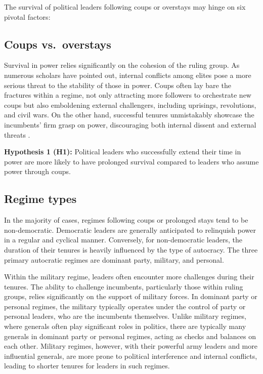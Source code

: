 \documentclass[
  a4paper,
  12pt]{article}
\begin{document}
The survival of political leaders following coups or overstays may hinge
on six pivotal factors:

\subsection{Coups vs.~overstays}\label{coups-vs.-overstays}

Survival in power relies significantly on the cohesion of the ruling
group. As numerous scholars have pointed out, internal conflicts among
elites pose a more serious threat to the stability of those in power.
Coups often lay bare the fractures within a regime, not only attracting
more followers to orchestrate new coups but also emboldening external
challengers, including uprisings, revolutions, and civil wars. On the
other hand, successful tenures unmistakably showcase the incumbents'
firm grasp on power, discouraging both internal dissent and external
threats \citep{dahl2023}.

\textbf{Hypothesis 1 (H1):} Political leaders who successfully extend
their time in power are more likely to have prolonged survival compared
to leaders who assume power through coups.

\subsection{Regime types}\label{regime-types}

In the majority of cases, regimes following coups or prolonged stays
tend to be non-democratic. Democratic leaders are generally anticipated
to relinquish power in a regular and cyclical manner. Conversely, for
non-democratic leaders, the duration of their tenures is heavily
influenced by the type of autocracy. The three primary autocratic
regimes are dominant party, military, and personal.

Within the military regime, leaders often encounter more challenges
during their tenures. The ability to challenge incumbents, particularly
those within ruling groups, relies significantly on the support of
military forces. In dominant party or personal regimes, the military
typically operates under the control of party or personal leaders, who
are the incumbents themselves. Unlike military regimes, where generals
often play significant roles in politics, there are typically many
generals in dominant party or personal regimes, acting as checks and
balances on each other. Military regimes, however, with their powerful
army leaders and more influential generals, are more prone to political
interference and internal conflicts, leading to shorter tenures for
leaders in such regimes.
\end{document}
